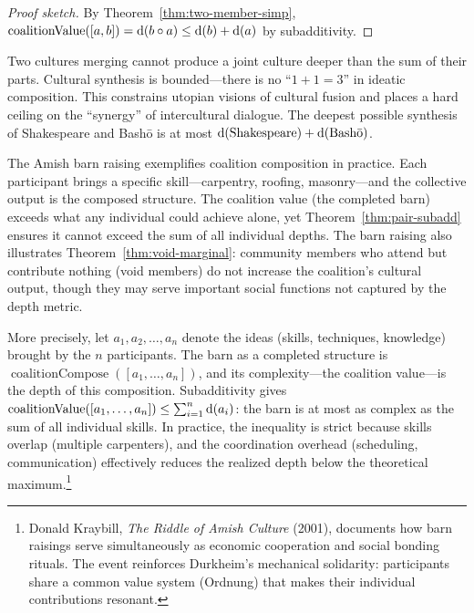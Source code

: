 \begin{proof}[Proof sketch]
By Theorem~\ref{thm:two-member-simp},
$\operatorname{coalitionValue}([a, b]) = \operatorname{d}(b \circ a)
\le \operatorname{d}(b) + \operatorname{d}(a)$ by subadditivity.
\end{proof}

Two cultures merging cannot produce a joint culture deeper than the sum of
their parts.  Cultural synthesis is bounded---there is no ``$1 + 1 = 3$'' in
ideatic composition.  This constrains utopian visions of cultural fusion and
places a hard ceiling on the ``synergy'' of intercultural dialogue.  The
deepest possible synthesis of Shakespeare and Bashō is at most
$\operatorname{d}(\text{Shakespeare}) + \operatorname{d}(\text{Bashō})$.

\begin{example}
\label{ex:barn-raising}
The Amish barn raising exemplifies coalition composition in practice.
Each participant brings a specific skill---carpentry, roofing, masonry---and
the collective output is the composed structure.  The coalition value
(the completed barn) exceeds what any individual could achieve alone, yet
Theorem~\ref{thm:pair-subadd} ensures it cannot exceed the sum of all
individual depths.  The barn raising also illustrates
Theorem~\ref{thm:void-marginal}: community members who attend but
contribute nothing (void members) do not increase the coalition's cultural
output, though they may serve important social functions not captured by
the depth metric.

More precisely, let $a_1, a_2, \dots, a_n$ denote the ideas (skills,
techniques, knowledge) brought by the $n$ participants.  The barn as a
completed structure is $\operatorname{coalitionCompose}([a_1, \dots, a_n])$,
and its complexity---the coalition value---is the depth of this composition.
Subadditivity gives $\operatorname{coalitionValue}([a_1, \dots, a_n])
\le \sum_{i=1}^n \operatorname{d}(a_i)$: the barn is at most as complex as the sum
of all individual skills.  In practice, the inequality is strict because
skills overlap (multiple carpenters), and the coordination overhead
(scheduling, communication) effectively reduces the realized depth below
the theoretical maximum.\footnote{Donald Kraybill, \textit{The Riddle of Amish
Culture} (2001), documents how barn raisings serve simultaneously as
economic cooperation and social bonding rituals.  The event reinforces
Durkheim's mechanical solidarity: participants share a common value system
(Ordnung) that makes their individual contributions resonant.}
\end{example}

